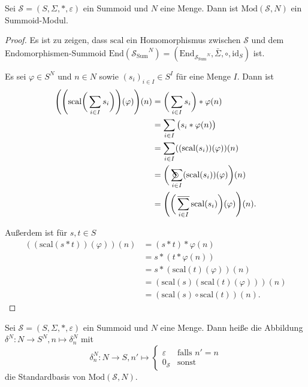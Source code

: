 \documentclass{article}
\DeclareMathOperator*{\sumcirc}{%
  \ThisStyle{\mathop{\ensurestackMath{\stackinset{c}{-1.5\LMpt}{c}{}{%
  \rotatebox[origin=lb]{-90}{$\SavedStyle\scalerel*{\bm\Circle}{%
  i}$}}{\SavedStyle\sum}}}}}
\DeclareMathOperator*{\sumbar}{\overline{\sum}}
\begin{document}
\begin{theorem}
  Sei $\mathcal{S} = (S, \Sigma, \ast, \varepsilon)$ ein Summoid und $N$ eine Menge.
  Dann ist $\text{Mod}(\mathcal{S}, N)$ ein Summoid-Modul.
\end{theorem}
\begin{proof}
  Es ist zu zeigen, dass $\text{scal}$ ein Homomorphismus 
  zwischen $\mathcal{S}$ und dem Endomorphismen-Summoid $\text{End}({\mathcal{S}_\text{Sum}}^N) = (\text{End}_{{\mathcal{S}_\text{Sum}}^N}, \bar\Sigma, \circ, \text{id}_S)$ ist.

  Es sei $\varphi \in S^N$ und $n \in N$ sowie $(s_i)_{i \in I} \in S^I$ für eine Menge $I$. 
  Dann ist
  \begin{align*}
    \Bigg(\Bigg(\text{scal}\bigg(\sum_{i \in I}s_i\bigg)\Bigg)(\varphi)\Bigg)(n) 
    &= \bigg(\sum_{i \in I} s_i \bigg) \ast \varphi(n) \\
    &= \sum_{i \in I} \big(s_i \ast \varphi(n)\big) \\
    &= \sum_{i \in I} ((\text{scal}(s_i))(\varphi))(n) \\
    &= \bigg(\sumcirc_{i \in I} (\text{scal}(s_i))(\varphi)\bigg)(n) \\
    &= \Bigg(\bigg(\sumbar_{i \in I}\text{scal}(s_i)\bigg)(\varphi)\Bigg)(n).
  \end{align*}

  Außerdem ist für $s, t \in S$
  \begin{align*}
    ((\text{scal}(s \ast t))(\varphi))(n)
    &= (s \ast t) \ast \varphi(n) \\
    &= s \ast (t \ast \varphi(n)) \\
    &= s \ast (\text{scal}(t)(\varphi))(n) \\
    &= (\text{scal}(s)(\text{scal}(t)(\varphi)))(n) \\
    &= (\text{scal}(s) \circ \text{scal}(t))(n).
  \end{align*}
\end{proof}

\begin{definition}
  Sei $\mathcal{S} = (S, \Sigma, \ast, \varepsilon)$ ein Summoid und $N$ eine Menge.
  Dann heiße die Abbildung $\delta^N \colon N \to S^N, n \mapsto \delta^N_n$ mit
  \begin{equation*}
    \delta^N_n \colon N \to S, n' \mapsto
    \begin{cases}
      \varepsilon & \text{falls } n' = n \\
      0_\mathcal{S} & \text{sonst}
    \end{cases}
  \end{equation*}
  die Standardbasis von $\text{Mod}(\mathcal{S}, N)$.
\end{definition}
\end{document}
